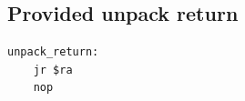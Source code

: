 \subsection{Provided unpack return}
\begin{verbatim}
unpack_return:
    jr $ra
    nop
\end{verbatim}
